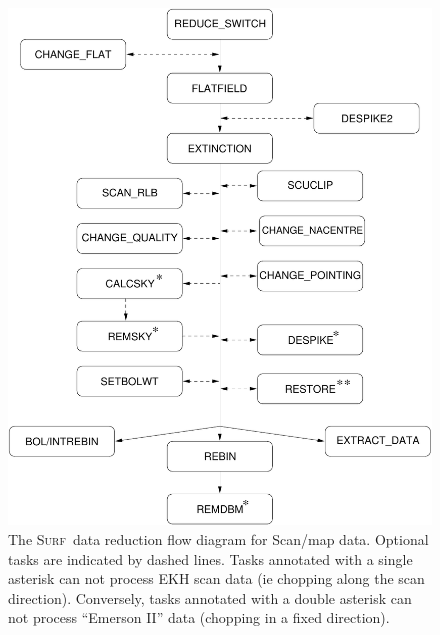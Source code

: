 \documentclass[twoside,11pt]{starlink}
\providecommand{\scusoft}          {\textsc{Surf}}
\begin{document}
\begin{figure}
\includegraphics[width=\textwidth]{sun216_flow_scan}
\caption{The \scusoft\ data reduction flow diagram for Scan/map
data. Optional tasks are
indicated by dashed lines. Tasks annotated with a single asterisk
can not process EKH scan data (ie chopping along the scan direction).
Conversely, tasks annotated with a double asterisk can not process
``Emerson II'' data (chopping in a fixed direction).
}
\label{flowpath_scan}
\end{figure}
\end{document}
